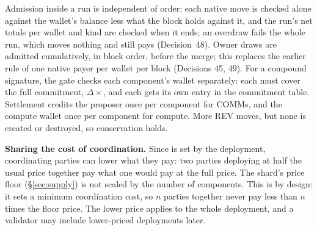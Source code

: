 \documentclass[11pt]{article}
\newcommand{\code}{\path}
\begin{document}
Admission inside a run is independent of order: each native move is checked alone against the wallet's balance less what the block holds against it, and the run's net totals per wallet and kind are checked when it ends; an overdraw fails the whole run, which moves nothing and still pays (Decision~48). Owner draws are admitted cumulatively, in block order, before the merge; this replaces the earlier rule of one native payer per wallet per block (Decisions 45, 49).
For a compound signature, the gate checks each component's wallet separately: each must cover the full commitment, $\Delta \times {}$\code{phloPrice}, and each gets its own entry in the commitment table. Settlement credits the proposer once per component for COMMs, and the compute wallet once per component for compute. More REV moves, but none is created or destroyed, so conservation holds.

\textbf{Sharing the cost of coordination.} Since \code{phloPrice} is set by the deployment, coordinating parties can lower what they pay: two parties deploying at half the usual price together pay what one would pay at the full price. The shard's price floor (\S\ref{sec:supply}) is not scaled by the number of components. This is by design: it sets a minimum coordination cost, so $n$ parties together never pay less than $n$ times the floor price. The lower price applies to the whole deployment, and a validator may include lower-priced deployments later.
\end{document}

